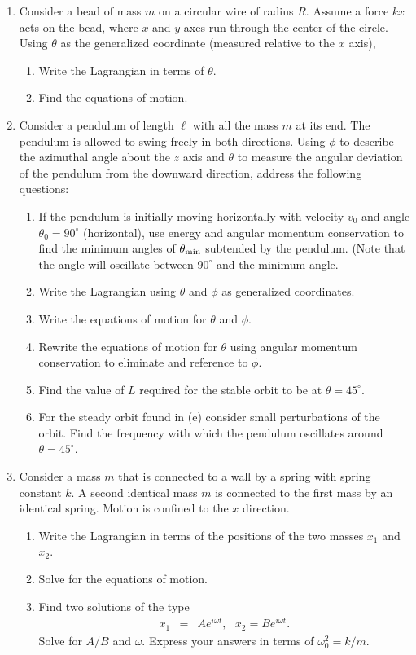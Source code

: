 \begin{enumerate}
\item Consider a bead of mass $m$ on a circular wire of radius
  $R$. Assume a force $kx$ acts on the bead, where $x$ and $y$ axes
  run through the center of the circle. Using $\theta$ as the
  generalized coordinate (measured relative to the $x$ axis),
\begin{enumerate}
\item Write the Lagrangian in terms of $\theta$.
\item Find the equations of motion.
\end{enumerate}

\item Consider a pendulum of length $\ell$ with all the mass $m$ at
  its end. The pendulum is allowed to swing freely in both
  directions. Using $\phi$ to describe the azimuthal angle about the
  $z$ axis and $\theta$ to measure the angular deviation of the
  pendulum from the downward direction, address the following
  questions:
\begin{enumerate}
\item If the pendulum is initially moving horizontally with velocity
  $v_0$ and angle $\theta_0=90^\circ$ (horizontal), use energy and
  angular momentum conservation to find the minimum angles of
  $\theta_{\rm min}$ subtended by the pendulum. (Note that the angle
  will oscillate between $90^\circ$ and the minimum angle.
\item Write the Lagrangian using $\theta$ and $\phi$ as generalized
  coordinates.
\item Write the equations of motion for $\theta$ and $\phi$.
\item Rewrite the equations of motion for $\theta$ using angular
  momentum conservation to eliminate and reference to $\phi$.
\item Find the value of $L$ required for the stable orbit to be at
  $\theta=45^\circ$.
\item For the steady orbit found in (e) consider small perturbations
  of the orbit. Find the frequency with which the pendulum oscillates
  around $\theta=45^\circ$.
\end{enumerate}

\item Consider a mass $m$ that is connected to a wall by a spring with
  spring constant $k$. A second identical mass $m$ is connected to the
  first mass by an identical spring. Motion is confined to the $x$
  direction.
\begin{enumerate}
\item Write the Lagrangian in terms of the positions of the two masses
  $x_1$ and $x_2$.
\item Solve for the equations of motion.
\item Find two solutions of the type
\begin{eqnarray*}
x_1&=&Ae^{i\omega t},~~~x_2=Be^{i\omega t}.
\end{eqnarray*}
Solve for $A/B$ and $\omega$. Express your answers in terms of
$\omega_0^2=k/m$.
\end{enumerate}


\end{enumerate}
